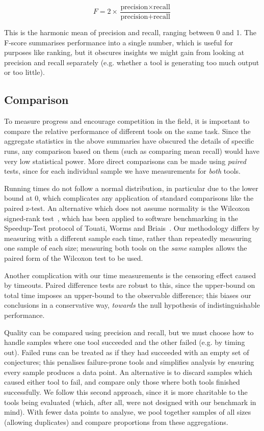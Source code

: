 \begin{equation*}
  F = 2 \times \frac{\text{precision} \times \text{recall}}
                    {\text{precision} +      \text{recall}}
\end{equation*}

This is the harmonic mean of precision and recall, ranging between 0 and 1. The
F-score summarises performance into a single number, which is useful for
purposes like ranking, but it obscures insights we might gain from looking at
precision and recall separately (e.g. whether a tool is generating too much
output or too little).

\subsection{Comparison}

To measure progress and encourage competition in the field, it is important to
compare the relative performance of different tools on the same task. Since the
aggregate statistics in the above summaries have obscured the details of
specific runs, any comparison based on them (such as comparing mean recall)
would have very low statistical power. More direct comparisons can be made using
\emph{paired} tests, since for each individual sample we have measurements for
\emph{both} tools.

Running times do not follow a normal distribution, in particular due to the
lower bound at 0, which complicates any application of standard comparisons like
the paired z-test. An alternative which does not assume normality is the
Wilcoxon signed-rank test~\cite{wilcoxon1945individual}, which has been applied
to software benchmarking in the Speedup-Test protocol of Touati, Worms and
Briais~\cite{touati2013speedup}. Our methodology differs by measuring with a
different sample each time, rather than repeatedly measuring one sample of each
size; measuring both tools on the \emph{same} samples allows the paired form of
the Wilcoxon test to be used.

Another complication with our time measurements is the censoring effect caused
by timeouts. Paired difference tests are robust to this, since the upper-bound
on total time imposes an upper-bound to the observable difference; this biases
our conclusions in a conservative way, \emph{towards} the null hypothesis of
indistinguishable performance.

Quality can be compared using precision and recall, but we must choose how to
handle samples where one tool succeeded and the other failed (e.g. by timing
out). Failed runs can be treated as if they had succeeded with an empty set of
conjectures; this penalises failure-prone tools and simplifies analysis by
ensuring every sample produces a data point. An alternative is to discard
samples which caused either tool to fail, and compare only those where both
tools finished successfully. We follow this second approach, since it is more
charitable to the tools being evaluated (which, after all, were not designed
with our benchmark in mind). With fewer data points to analyse, we pool together
samples of all sizes (allowing duplicates) and compare proportions from these
aggregations.

